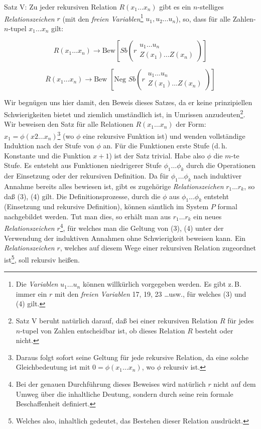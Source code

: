 \documentclass[draft]{scrartcl}
\begin{document}
Satz V: Zu jeder rekursiven Relation $R\left(x_1 \dots x_n\right)$
gibt es ein $n$-stelliges \textit{Relationszeichen} $r$
(mit den \textit{freien Variablen}\footnote{Die \textit{Variablen}
$u_1 \dots u_n$ können willkürlich vorgegeben werden. Es gibt
z.\,B. immer ein $r$ mit den \textit{freien Variablen} 17, 19, 23 \dots usw.,
für welches (3) und (4) gilt.}
$u_1, u_2 \dots u_n$), so, dass für alle Zahlen-$n$-tupel
$x_1 \dots x_n$ gilt:

\begin{equation}
	R\left(x_1 \dots x_n\right) \longrightarrow \text{Bew}\left[Sb\left(r\substack{u_1 \dots u_n\\ Z\left(x_1\right) \dots Z\left(x_n\right)}\right)\right]
\end{equation}

\begin{equation}
	\overline{R}\left(x_1 \dots x_n\right) \longrightarrow \text{Bew }\left[\text{Neg } Sb\left(r\substack{u_1 \dots u_n \\ Z\left(x_1\right) \dots Z\left(x_n\right)}\right)\right]
\end{equation}

Wir begnügen uns hier damit, den Beweis dieses Satzes, da er keine prinzipiellen Schwierigkeiten bietet und ziemlich umständlich ist, in Umrissen anzudeuten\footnote{Satz V beruht natürlich darauf, daß bei einer rekursiven Relation $R$ für jedes $n$-tupel von Zahlen  entscheidbar ist, ob dieses Relation $R$ besteht oder nicht.}.
Wir beweisen den Satz für alle Relationen $R\left(x_1 \dots x_n\right)$ der Form: $x_1 = \phi\left(x2 \dots x_n\right)$\footnote{Daraus folgt sofort seine Geltung für jede rekursive Relation, da eine solche Gleichbedeutung ist mit $0 = \phi\left(x_1 \dots x_n\right)$, wo $\phi$ rekursiv ist.}
(wo $\phi$ eine rekursive Funktion ist) und wenden vollständige Induktion nach der Stufe von $\phi$ an. Für die Funktionen erste Stufe (d.\,h. Konstante und die Funktion $x + 1$) ist der Satz trivial. Habe also
$\phi$ die $m$-te Stufe. Es entsteht aus Funktionen niedrigerer Stufe $\phi_1 \dots \phi_k$ durch die Operationen der Einsetzung oder der rekursiven Definition. Da für $\phi_1 \dots \phi_k$ nach induktiver Annahme bereits alles bewiesen ist, gibt es zugehörige \textit{Relationszeichen} $r_1 \dots r_k$, so daß (3), (4) gilt. Die Definitionsprozesse, durch die $\phi$ aus $\phi_1 \dots \phi_k$ entsteht (Einsetzung und rekursive Definition), können sämtlich im System $P$ formal nachgebildet werden. Tut man dies, so erhält man aus $r_1 \dots r_k$ ein neues \textit{Relationszeichen} $r$\footnote{Bei der genauen Durchführung dieses Beweises wird natürlich $r$ nicht auf dem Umweg über die inhaltliche Deutung, sondern durch seine rein formale Beschaffenheit definiert.},
für welches man die Geltung von (3), (4) unter der Verwendung der induktiven Annahmen ohne Schwierigkeit beweisen kann. Ein \textit{Relationszeichen} $r$, welches auf diesem Wege einer rekursiven Relation zugeordnet ist\footnote{Welches also, inhaltlich gedeutet, das Bestehen dieser Relation ausdrückt.},
soll rekursiv heißen.
\end{document}
